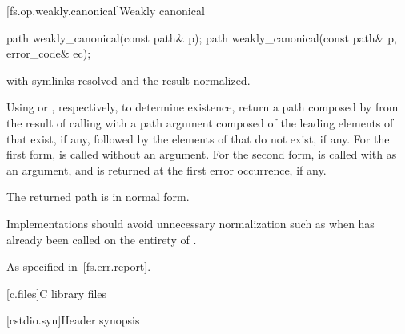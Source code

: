 [fs.op.weakly.canonical]{Weakly canonical}

%
\begin{itemdecl}
path weakly_canonical(const path& p);
path weakly_canonical(const path& p, error_code& ec);
\end{itemdecl}

\begin{itemdescr}
\pnum
\returns
{} with symlinks resolved and
  the result normalized.

\pnum
\effects
Using  or , respectively,
  to determine existence,
  return a path composed by 
  from the result of calling 
  with a path argument composed of
  the leading elements of  that exist, if any, followed by
  the elements of  that do not exist, if any.
  For the first form,
   is called without an  argument.
  For the second form,
   is called
  with  as an  argument, and
   is returned at the first error occurrence, if any.

\pnum
\ensures
The returned path is in normal form.

\pnum
\remarks
Implementations should
  avoid unnecessary normalization such as
  when  has already been called on the entirety of .

\pnum
\throws
As specified in~\ref{fs.err.report}.
\end{itemdescr}

[c.files]{C library files}

[cstdio.syn]{Header  synopsis}

